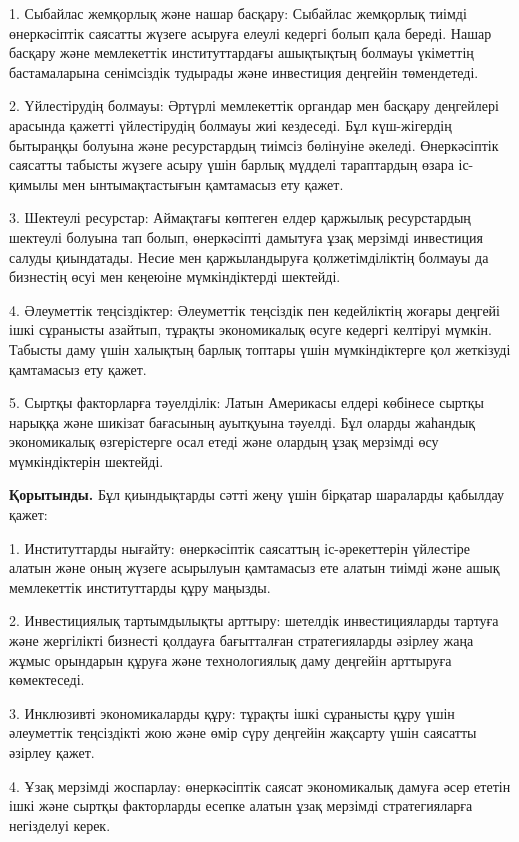 \begin{multicols}{2}
1. Сыбайлас жемқорлық және нашар басқару: Сыбайлас жемқорлық тиімді
өнеркәсіптік саясатты жүзеге асыруға елеулі кедергі болып қала береді.
Нашар басқару және мемлекеттік институттардағы ашықтықтың болмауы
үкіметтің бастамаларына сенімсіздік тудырады және инвестиция деңгейін
төмендетеді.

2. Үйлестірудің болмауы: Әртүрлі мемлекеттік органдар мен басқару
деңгейлері арасында қажетті үйлестірудің болмауы жиі кездеседі. Бұл
күш-жігердің бытыраңқы болуына және ресурстардың тиімсіз бөлінуіне
әкеледі. Өнеркәсіптік саясатты табысты жүзеге асыру үшін барлық мүдделі
тараптардың өзара іс-қимылы мен ынтымақтастығын қамтамасыз ету қажет.

3. Шектеулі ресурстар: Аймақтағы көптеген елдер қаржылық ресурстардың
шектеулі болуына тап болып, өнеркәсіпті дамытуға ұзақ мерзімді
инвестиция салуды қиындатады. Несие мен қаржыландыруға қолжетімділіктің
болмауы да бизнестің өсуі мен кеңеюіне мүмкіндіктерді шектейді.

4. Әлеуметтік теңсіздіктер: Әлеуметтік теңсіздік пен кедейліктің жоғары
деңгейі ішкі сұранысты азайтып, тұрақты экономикалық өсуге кедергі
келтіруі мүмкін. Табысты даму үшін халықтың барлық топтары үшін
мүмкіндіктерге қол жеткізуді қамтамасыз ету қажет.

5. Сыртқы факторларға тәуелділік: Латын Америкасы елдері көбінесе сыртқы
нарыққа және шикізат бағасының ауытқуына тәуелді. Бұл оларды жаһандық
экономикалық өзгерістерге осал етеді және олардың ұзақ мерзімді өсу
мүмкіндіктерін шектейді.

{\bfseries Қорытынды.} Бұл қиындықтарды сәтті жеңу үшін бірқатар шараларды
қабылдау қажет:

1. Институттарды нығайту: өнеркәсіптік саясаттың іс-әрекеттерін
үйлестіре алатын және оның жүзеге асырылуын қамтамасыз ете алатын тиімді
және ашық мемлекеттік институттарды құру маңызды.

2. Инвестициялық тартымдылықты арттыру: шетелдік инвестицияларды тартуға
және жергілікті бизнесті қолдауға бағытталған стратегияларды әзірлеу
жаңа жұмыс орындарын құруға және технологиялық даму деңгейін арттыруға
көмектеседі.

3. Инклюзивті экономикаларды құру: тұрақты ішкі сұранысты құру үшін
әлеуметтік теңсіздікті жою және өмір сүру деңгейін жақсарту үшін
саясатты әзірлеу қажет.

4. Ұзақ мерзімді жоспарлау: өнеркәсіптік саясат экономикалық дамуға әсер
ететін ішкі және сыртқы факторларды есепке алатын ұзақ мерзімді
стратегияларға негізделуі керек.


\end{multicols}
